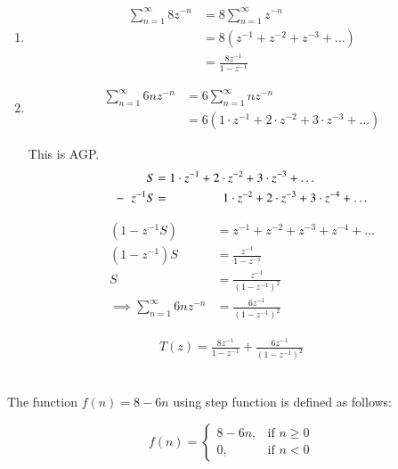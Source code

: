 \documentclass[journal,12pt,twocolumn]{IEEEtran}
\theoremstyle{remark}
\begin{document}
\begin{enumerate}

    \item 
    \begin{align}\sum_{n=1}^{\infty} 8z^{-n} &= 8\sum_{n=1}^{\infty} z^{-n}\\
    &=8(z^{-1}+z^{-2}+z^{-3}+\dots)\\
    &=\frac{8z^{-1}}{1-z^{-1}}
    \end{align}
    
    \item 
    \begin{align}
    \sum_{n=1}^{\infty} 6nz^{-n} &= 6\sum_{n=1}^{\infty}nz^{-n}\\
    &=6(1\cdot z^{-1} + 2\cdot z^{-2} + 3\cdot z^{-3} + \dots)
    \end{align}
    
    This is AGP.
    \begin{align}
    S&=1\cdot z^{-1}+2\cdot z^{-2}+3\cdot z^{-3}+\dots\\
    -\hspace{2mm}z^{-1}S&=\hspace{1.5cm}1\cdot z^{-2}+2\cdot z^{-3}+3\cdot z^{-4}+\dots
    \end{align}
    
    \hrulefill

    \begin{align}
    (1-z^{-1}S)&=z^{-1}+z^{-2}+z^{-3}+z^{-4}+\dots\\
    (1-z^{-1})S&=\frac{z^{-1}}{1-z^{-1}}\\
    S&=\frac{z^{-1}}{(1-z^{-1})^{2}}\\
    \implies \sum_{n=1}^{\infty}6nz^{-n}&=\frac{6z^{-1}}{(1-z^{-1})^{2}}
    \end{align}
\end{enumerate}
    \begin{align}
    T(z)=\frac{8z^{-1}}{1-z^{-1}}+\frac{6z^{-1}}{(1-z^{-1})^{2}}
    \end{align}\

The function $f(n) = 8 - 6n$ using step function is defined as follows:

\[f(n) = 
\begin{cases}
    8 - 6n, & \text{if } n \geq 0 \\
    0, & \text{if } n < 0
\end{cases}\]
\end{document}
